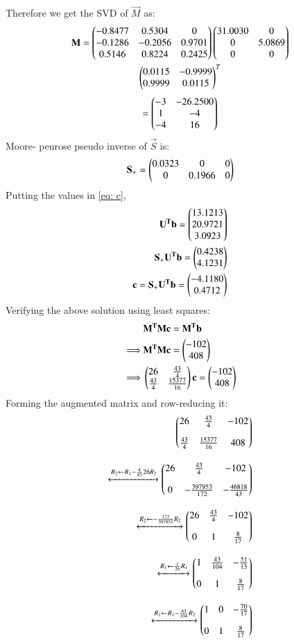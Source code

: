 \documentclass[journal,12pt,twocolumn]{IEEEtran}
\begin{document}
Therefore we get the SVD of $\vec M $ as:
\begin{multline}
    \mathbf M = \begin{pmatrix}-0.8477& 0.5304 & 0\\
   -0.1286 & -0.2056 & 0.9701\\
    0.5146 & 0.8224 & 0.2425\end{pmatrix} \begin{pmatrix}31.0030 & 0 \\ 0 & 5.0869 \\0 & 0\end{pmatrix}\\ \begin{pmatrix}0.0115 & -0.9999\\0.9999 & 0.0115\end{pmatrix}^T
\end{multline}
\begin{align}
     = \begin{pmatrix}-3 & -26.2500\\1 &  -4\\ -4 &  16\end{pmatrix}
\end{align}
Moore- penrose pseudo inverse of $\vec S $ is:
\begin{align}
    \mathbf S_+ = \begin{pmatrix}0.0323 &0 &0\\ 0 & 0.1966 & 0\end{pmatrix}
\end{align}
Putting the values in \eqref{eq: c},
\begin{align}
    \mathbf {U^Tb}= \begin{pmatrix}13.1213\\  20.9721\\3.0923\end{pmatrix}\\
    \mathbf {S_+ U^T b}= \begin{pmatrix}0.4238\\  4.1231\end{pmatrix}\\
    \mathbf {c}= \mathbf{S_+ U^T b}= \begin{pmatrix}-4.1180\\0.4712\end{pmatrix}\label{eq: svd sol c}
\end{align}
Verifying the above solution using least squares:
\begin{align}
    &\mathbf{M^T M c} =\mathbf{ M^T b}\label{eq: LS}\\
    \implies & \mathbf {M^T Mc}= \begin{pmatrix}-102\\408\end{pmatrix}\\
    \implies & \begin{pmatrix}26 & \frac{43}{4}\\\frac{43}{4} & \frac{15377}{16}\end{pmatrix}\mathbf c = \begin{pmatrix}-102\\408\end{pmatrix} 
\end{align}
Forming the augmented matrix and row-reducing it:
\begin{align}
    \begin{pmatrix}26 & \frac{43}{4} & -102\\[1em]\frac{43}{4} & \frac{15377}{16} & 408\end{pmatrix}\\[1em]
	\xleftrightarrow[]{R_2\leftarrow R_1 -\frac{4}{43} 26 R_2} 
	\begin{pmatrix}26& \frac{43}{4} & -102\\[1em] 0 & -\frac{397953}{172} & -\frac{46818}{43}\end{pmatrix}\\[1em]
	\xleftrightarrow[]{R_2\leftarrow -\frac{172}{397953} R_2} 
	\begin{pmatrix}26 & \frac{43}{4} & -102\\[1em]0 & 1 & \frac{8}{17}\end{pmatrix}\\[1em]
	\xleftrightarrow[]{R_1\leftarrow \frac{1}{26} R_1} 
	\begin{pmatrix}1 & \frac{43}{104} & -\frac{51}{13}\\[1em] 0 & 1 & \frac{8}{17}\end{pmatrix}\\[1em]
	\xleftrightarrow[]{R_1\leftarrow R_1 -\frac{43}{104}R_2}
	\begin{pmatrix}1 & 0 & -\frac{70}{17}\\[1em] 0 & 1 & \frac{8}{17}\end{pmatrix} \label{eq: sol}
\end{align}
\end{document}
